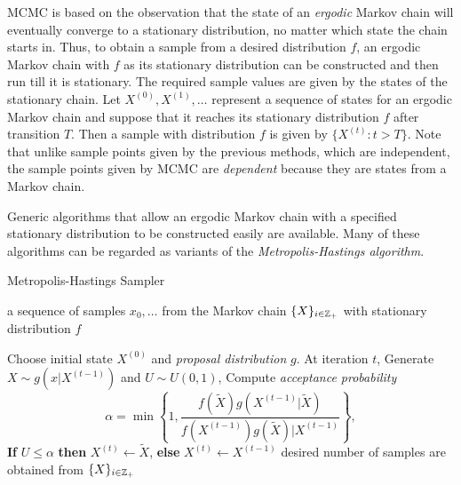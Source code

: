MCMC is based on the observation that the state of an {\it ergodic} Markov chain will eventually converge to a stationary distribution, no matter which state the chain starts in. Thus, to obtain a sample from a desired distribution $f$, an ergodic Markov chain with $f$ as its stationary distribution can be constructed and then run till it is stationary. The required sample values are given by the states of the stationary chain. Let $X^{(0)},X^{(1)},\ldots$ represent a sequence of states for an ergodic Markov chain and suppose that it reaches its stationary distribution $f$ after transition $T$. Then a sample with distribution $f$ is given by $\{X^{(t)}:t>T\}$. Note that unlike sample points given by the previous methods, which are independent, the sample points given by MCMC are {\it dependent} because they are states from a Markov chain.

Generic algorithms that allow an ergodic Markov chain with a specified stationary distribution to be constructed easily are available. Many of these algorithms can be regarded as variants of the {\it Metropolis-Hastings algorithm}.

\begin{algorithm}%
\caption{Metropolis-Hastings Sampler}
\label{A:MHSampler}
\begin{algorithmic}[1]
 a sequence of samples $x_0,\ldots$ from the Markov chain $\{X\}_{i \in \mathbb{Z}_+}$ with stationary distribution $f$

\STATE Choose initial state $X^{(0)}$ and {\it proposal distribution} $g$.
\REPEAT
\STATE At iteration $t$,
\STATE Generate $X\sim g(x|X^{(t-1)})$ and $U\sim U(0,1)$,
\STATE Compute {\it acceptance probability}
\begin{equation}
\alpha=\min\left\{1,\frac{f(\tilde{X})g(X^{(t-1)}|\tilde{X})}{f(X^{(t-1)})g(\tilde{X})|X^{(t-1)}} \right\},
\end{equation}
\STATE
{\bf If} $U \leq \alpha$
{\bf then} $X^{(t)} \gets \tilde{X}$, %
{\bf else} $X^{(t)} \gets X^{(t-1)}$
\UNTIL desired number of samples are obtained from $\{X\}_{i \in \mathbb{Z}_+}$
\end{algorithmic}
\end{algorithm}


